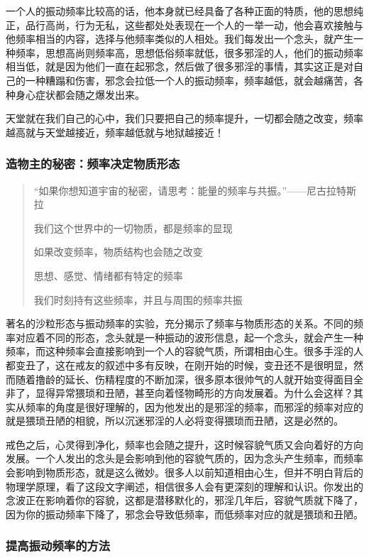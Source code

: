 \documentclass{ctexart}
\begin{document}
一个人的振动频率比较高的话，他本身就已经具备了各种正面的特质，他的思想纯正，品行高尚，行为无私，这些都处处表现在一个人的一举一动，他会喜欢接触与他频率相当的内容，选择与他频率类似的人相处。我们每发出一个念头，就产生一种频率，思想高尚则频率高，思想低俗频率就低，很多邪淫的人，他们的振动频率相当低，就是因为他们一直在起邪念，然后做了很多邪淫的事情，其实这正是对自己的一种糟蹋和伤害，邪念会拉低一个人的振动频率，频率越低，就会越痛苦，各种身心症状都会随之爆发出来。

天堂就在我们自己的心中，我们只要把自己的频率提升，一切都会随之改变，频率越高就与天堂越接近，频率越低就与地狱越接近！

\subsubsection{造物主的秘密：频率决定物质形态}

\begin{quotation}
    “如果你想知道宇宙的秘密，请思考：能量的频率与共振。”\hfill ——尼古拉特斯拉

    我们这个世界中的一切物质，都是频率的显现

    如果改变频率，物质结构也会随之改变

    思想、感觉、情绪都有特定的频率

    我们时刻持有这些频率，并且与周围的频率共振
\end{quotation}

著名的沙粒形态与振动频率的实验，充分揭示了频率与物质形态的关系。不同的频率对应着不同的形态，念头就是一种振动的波形信息，起一个念头，就会产生一种频率，而这种频率会直接影响到一个人的容貌气质，所谓相由心生。很多手淫的人都变丑了，这在戒友的叙述中多有反映，在刚开始的时候，变丑还不是很明显，然而随着撸龄的延长、伤精程度的不断加深，很多原本很帅气的人就开始变得面目全非了，显得异常猥琐和丑陋，甚至向着怪物畸形的方向发展着。为什么会这样？其实从频率的角度是很好理解的，因为他发出的是邪淫的频率，而邪淫的频率对应的就是猥琐丑陋的相貌，所以沉迷邪淫的人必将变得猥琐而丑陋，这是必然的。

戒色之后，心灵得到净化，频率也会随之提升，这时候容貌气质又会向着好的方向发展。一个人发出的念头是会影响到他的容貌气质的，因为念头产生频率，而频率会影响到物质形态，就是这么微妙。很多人以前知道相由心生，但并不明白背后的物理学原理，看了这段文字阐述，相信很多人会有更深刻的理解和认识。你发出的念波正在影响着你的容貌，这都是潜移默化的，邪淫几年后，容貌气质就下降了，因为你的振动频率下降了，邪念会导致低频率，而低频率对应的就是猥琐和丑陋。

\subsubsection{提高振动频率的方法}
\end{document}
